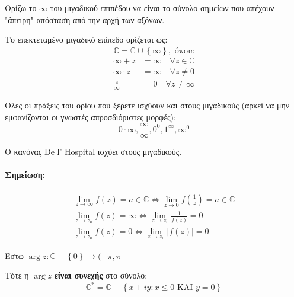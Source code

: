 \documentclass[12pt,a4paper,notitlepage,fleqn]{article}
\begin{document}
    Ορίζω το \( \infty \) του μιγαδικού επιπέδου να είναι το σύνολο
    σημείων που απέχουν "άπειρη" απόσταση από την αρχή των αξόνων.

    Το επεκτεταμένο μιγαδικό επίπεδο ορίζεται ως:
    \[
    \overline{\mathbb C} = \mathbb C \cup \left\lbrace \infty \right\rbrace,\text{ όπου:}
    \]
    \begin{align*}
    \infty+z &= \infty \quad \forall z \in \mathbb C \\
    \infty\cdot z &= \infty \quad \forall z \neq 0 \\
    \frac{z}{\infty} &= 0 \quad \forall z \neq \infty
    \end{align*}

    Όλες οι πράξεις του ορίου που ξέρετε ισχύουν και στους μιγαδικούς
    (αρκεί να μην εμφανίζονται οι γνωστές απροσδιόριστες μορφές):
    \[
    0\cdot\infty,\frac{\infty}{\infty},0^0,1^{\infty},\infty^0
    \]

    Ο κανόνας De l' Hospital ισχύει στους μιγαδικούς.

    \paragraph{Σημείωση:}
    \begin{gather*}
    \lim_{z\to \infty}f(z) = a \in \mathbb C \iff
    \lim_{z\to0}f\left(\frac{1}{z}\right) = a\in\mathbb C  \\
    \lim_{z\to z_0}f(z) = \infty \iff \lim_{z\to z_0}\frac{1}{f(z)} = 0\\
    \lim_{z\to z_0}f(z) = 0 \iff \lim_{z\to z_0} \left|f(z)\right|=0
    \end{gather*}

    \begin{theorem*}[sidebyside,width=\textwidth]{}
    	Έστω \( \arg z:\mathbb C - \left\lbrace 0 \right\rbrace
    	\to (-\pi,\pi]
    	 \)

    	Τότε η \( \arg z \) \textbf{είναι συνεχής} στο σύνολο:
    	\[
    	\mathbb C^* = \mathbb C -
    	\left\lbrace
    	    x+iy: x \leq 0 \text{ ΚΑΙ } y = 0
    	 \right\rbrace
    	\]
    	\tcblower
    \end{theorem*}
\end{document}

